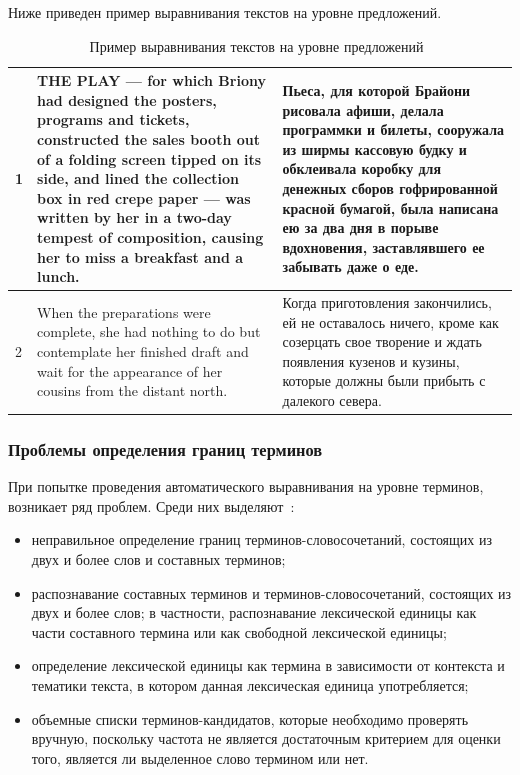 Ниже приведен пример выравнивания текстов на уровне предложений.

\begin{table}[H]
    \centering
    \begin{tabular}{|p{1cm}|p{7cm}|p{7cm}|}
        \hline
        1 & THE PLAY — for which Briony had designed the posters, programs and tickets, constructed the sales booth out of a folding screen tipped on its side, and lined the collection box in red crepe paper — was written by her in a two-day tempest of composition, causing her to miss a breakfast and a lunch. & Пьеса, для которой Брайони рисовала афиши, делала программки и билеты, сооружала из ширмы кассовую будку и обклеивала коробку для денежных сборов гофрированной красной бумагой, была написана ею за два дня в порыве вдохновения, заставлявшего ее забывать даже о еде. \\ \hline
        2 & When the preparations were complete, she had nothing to do but contemplate her finished draft and wait for the appearance of her cousins from the distant north. & Когда приготовления закончились, ей не оставалось ничего, кроме как созерцать свое творение и ждать появления кузенов и кузины, которые должны были прибыть с далекого севера. \\ \hline
    \end{tabular}
    \caption{Пример выравнивания текстов на уровне предложений~\cite[с. 62]{cl2020}}
    \label{tab:al}
\end{table}

\subsubsection*{Проблемы определения границ терминов}

При попытке проведения автоматического выравнивания на уровне терминов, возникает ряд проблем.
Среди них выделяют~\cite{butenko2022}:
\begin{itemize}
    \item неправильное определение границ терминов-словосочетаний, состоящих из двух и более слов и составных терминов; 
    \item  распознавание составных терминов и терминов-словосочетаний, состоящих из двух и более слов; в частности, распознавание лексической единицы как части составного термина или как свободной лексической единицы; 
    \item определение лексической единицы как термина в зависимости от контекста и тематики текста, в котором данная лексическая единица употребляется; 
    \item объемные списки терминов-кандидатов, которые необходимо проверять вручную, поскольку частота не является достаточным критерием для оценки того, является ли выделенное слово термином или нет. 
\end{itemize}

